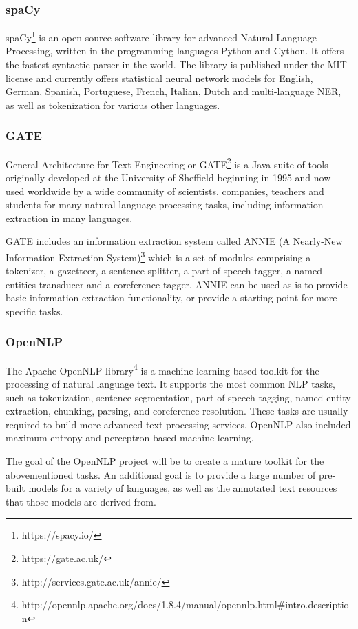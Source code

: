 \documentclass[thesis=M,english]{FITthesis}[2018/05/30]
\begin{document}
\subsubsection{spaCy}\label{spaCy}
spaCy\footnote{https://spacy.io/} \cite{wiki:spaCy} is an open-source software library for advanced Natural Language Processing, written in the programming languages Python and Cython. It offers the fastest syntactic parser in the world. The library is published under the MIT license and currently offers statistical neural network models for English, German, Spanish, Portuguese, French, Italian, Dutch and multi-language NER, as well as tokenization for various other languages.

\subsubsection{GATE}\label{GATE}
General Architecture for Text Engineering or GATE\footnote{https://gate.ac.uk/} \cite{wiki:GATE} is a Java suite of tools originally developed at the University of Sheffield beginning in 1995 and now used worldwide by a wide community of scientists, companies, teachers and students for many natural language processing tasks, including information extraction in many languages.

GATE includes an information extraction system called ANNIE (A Nearly-New Information Extraction System)\footnote{http://services.gate.ac.uk/annie/} which is a set of modules comprising a tokenizer, a gazetteer, a sentence splitter, a part of speech tagger, a named entities transducer and a coreference tagger. ANNIE can be used as-is to provide basic information extraction functionality, or provide a starting point for more specific tasks.

\subsubsection{OpenNLP}\label{OpenNLP}
The Apache OpenNLP library\footnote{http://opennlp.apache.org/docs/1.8.4/manual/opennlp.html\#intro.description} is a machine learning based toolkit for the processing of natural language text. It supports the most common NLP tasks, such as tokenization, sentence segmentation, part-of-speech tagging, named entity extraction, chunking, parsing, and coreference resolution. These tasks are usually required to build more advanced text processing services. OpenNLP also included maximum entropy and perceptron based machine learning.

The goal of the OpenNLP project will be to create a mature toolkit for the abovementioned tasks. An additional goal is to provide a large number of pre-built models for a variety of languages, as well as the annotated text resources that those models are derived from.
\end{document}

